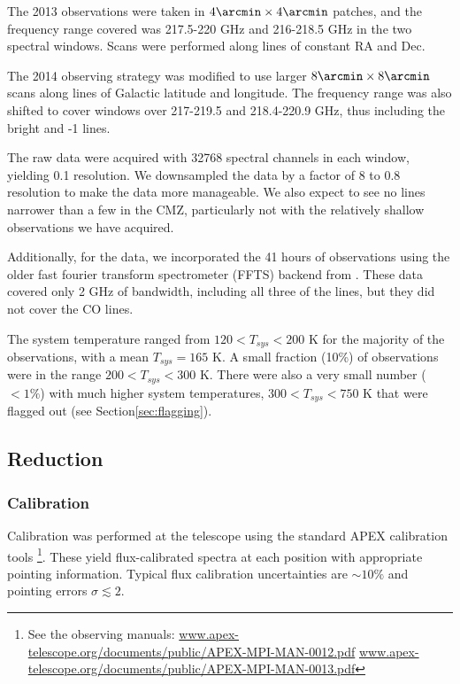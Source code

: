 The 2013 observations were taken in $4\arcmin \times 4\arcmin$ patches, and the
frequency range covered was 217.5-220 GHz and 216-218.5 GHz in the two spectral
windows.  Scans were performed along lines of constant RA and Dec.

The 2014 observing strategy was modified to use larger $8\arcmin \times
8\arcmin$ scans along lines of Galactic latitude and longitude.  The frequency
range was also shifted to cover windows over 217-219.5 and 218.4-220.9 GHz, thus
including the bright \thirteenco and -1 lines.


The raw data were acquired with 32768 spectral channels in each window, yielding
0.1 \kms resolution.  We downsampled the data by a factor of 8 to 0.8 \kms
resolution to make the data more manageable.  We also expect to see no lines
narrower than a few \kms in the CMZ, particularly not with the relatively
shallow observations we have acquired.

Additionally, for the \para data, we incorporated the 41 hours of observations
using the older fast fourier transform spectrometer (FFTS) backend from
\citet{Ao2013a}.  These data covered only 2
GHz of bandwidth, including all three of the \para lines, but they did not
cover the CO lines.

The system temperature ranged from $120 < T_{sys} < 200$ K for the majority of
the observations, with a mean $T_{sys}=165$ K.  A small fraction (10\%) of
observations were in the range $200 < T_{sys} < 300$ K.  There were also a very
small number ($<1\%$) with much higher system temperatures, $300 < T_{sys} <
750$ K that were flagged out (see Section\ref{sec:flagging}).

\subsection{Reduction}
\subsubsection{Calibration}
Calibration was performed at the telescope using the standard APEX calibration
tools
\footnote{See the observing manuals:
\url{www.apex-telescope.org/documents/public/APEX-MPI-MAN-0012.pdf}
\url{www.apex-telescope.org/documents/public/APEX-MPI-MAN-0013.pdf} }.
These yield flux-calibrated spectra at each position with appropriate pointing
information.  Typical flux calibration uncertainties are $\sim10\%$ and
pointing errors $\sigma\lesssim2$\arcsec. %

